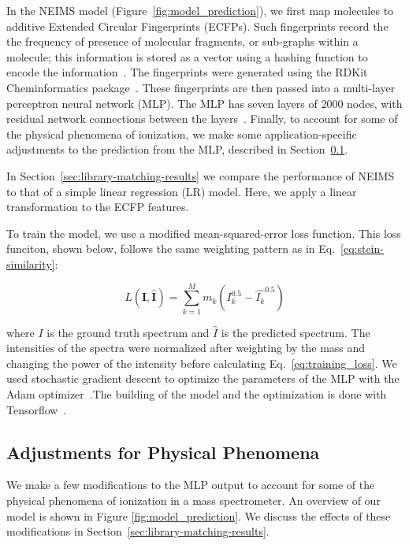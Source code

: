 In the NEIMS model (Figure~\ref{fig:model_prediction}), we first map molecules to additive Extended Circular Fingerprints (ECFPs).  Such fingerprints record the the frequency of presence of molecular fragments, or sub-graphs within a molecule; this information is stored as a vector using a hashing function to encode the information~\cite{Rogers_2010_ECFP}. The fingerprints were generated using the RDKit Cheminformatics package~\cite{rdkit}.
These fingerprints are then passed into a multi-layer perceptron neural network (MLP). The MLP has seven layers of 2000 nodes, with residual network connections between the layers~\cite{he_resnet}. Finally, to account for some of the physical phenomena of ionization, we make some application-specific adjustments to the prediction from the MLP, described in Section~\ref{sec:ms_physical_phenomena}.

In Section~\ref{sec:library-matching-results} we compare the performance of NEIMS to that of a simple linear regression (LR) model. Here, we apply a linear transformation to the ECFP features.

To train the model, we use a modified mean-squared-error loss function. This loss funciton, shown below, follows the same weighting pattern as in Eq.~\ref{eq:stein-similarity}:

\begin{equation}\label{eq:training_loss}
    L(\boldsymbol{I}, \hat{\boldsymbol{I}}) = \sum_{k=1}^{M} m_k (I_k^{0.5} - \hat{I_k}^{0.5})
\end{equation}

where $I$ is the ground truth spectrum and $\hat{I}$ is the predicted spectrum. The intensities of the spectra were normalized after weighting by the mass and changing the power of the intensity before calculating Eq.~\eqref{eq:training_loss}. We used stochastic gradient descent to optimize the parameters of the MLP with the Adam optimizer~\cite{Kingma_adam_optimizer}.The building of the model and the optimization is done with Tensorflow~\cite{Tensorflow-2016}.

\subsection{Adjustments for Physical Phenomena}\label{sec:ms_physical_phenomena}

We make a few modifications to the MLP output to account for some of the physical phenomena of ionization in a mass spectrometer. An overview of our model is shown in Figure \ref{fig:model_prediction}. We discuss the effects of these modifications in Section~\ref{sec:library-matching-results}.

